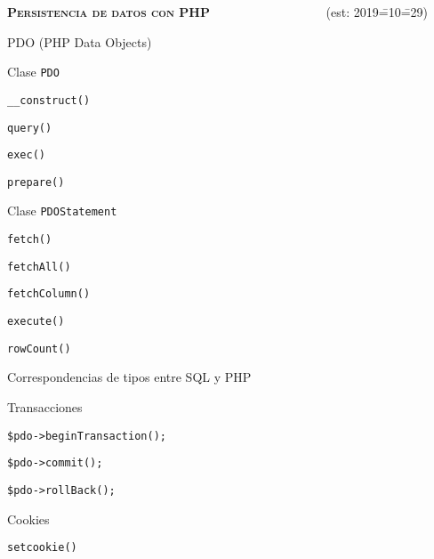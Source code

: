 \begin{longenum}
\begin{longenum}
\begin{longenum}
        \end{longenum}
    \end{longenum}
    \item \textbf{\textsc{Persistencia de datos con PHP}} \ \ \ \ \ \ \ \ \ \ \ \ \ \ \ \ \ \ (est: 2019\==10\==29)
    \begin{longenum}
        \item PDO (PHP Data Objects)
        \begin{longenum}
            \item Clase \texttt{PDO}
            \begin{longenum}
                \item \texttt{\_\_construct()}
                \item \texttt{query()}
                \item \texttt{exec()}
                \item \texttt{prepare()}
            \end{longenum}
            \item Clase \texttt{PDOStatement}
            \begin{longenum}
                \item \texttt{fetch()}
                \item \texttt{fetchAll()}
                \item \texttt{fetchColumn()}
                \item \texttt{execute()}
                \item \texttt{rowCount()}
            \end{longenum}
            \item Correspondencias de tipos entre SQL y PHP
            \item Transacciones
            \begin{longenum}
                \item \texttt{\$pdo->beginTransaction();}
                \item \texttt{\$pdo->commit();}
                \item \texttt{\$pdo->rollBack();}
            \end{longenum}
        \end{longenum}
        \item Cookies
        \begin{longenum}
            \item \texttt{setcookie()}

\end{longenum}
\end{longenum}
\end{longenum}
